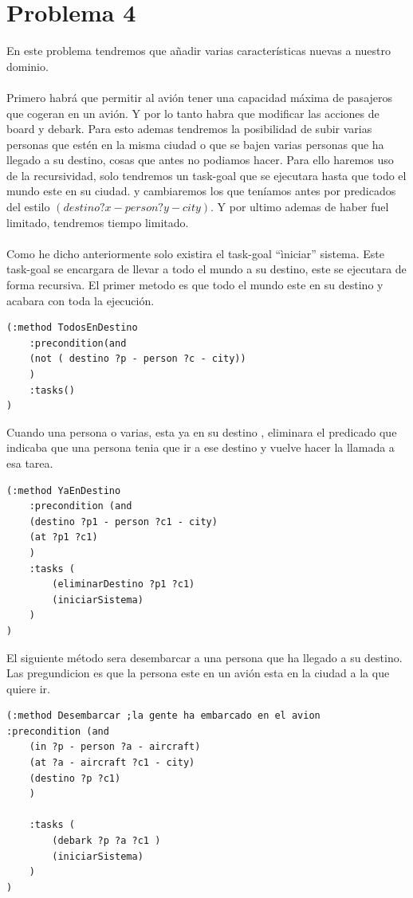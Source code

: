\documentclass[12pt,a4paper]{article}
\begin{document}
\section{Problema 4}
En este problema tendremos que añadir varias características nuevas a nuestro dominio.\\\\
Primero habrá que permitir al avión tener una capacidad máxima de pasajeros que cogeran en un avión. Y por lo tanto habra que modificar las acciones de board y debark. Para esto ademas tendremos la posibilidad de subir varias personas que estén en la misma ciudad o que se bajen varias personas que ha llegado a su destino, cosas que antes no podiamos hacer. Para ello haremos uso de la recursividad, solo tendremos un task-goal que se ejecutara hasta que todo el mundo este en su ciudad. y cambiaremos los que teníamos antes por predicados del estilo $(destino ?x - person ?y - city)$. Y por ultimo ademas de haber fuel limitado, tendremos tiempo limitado. \\\\
Como he dicho anteriormente solo existira el task-goal ``ìniciar'' sistema. Este task-goal se encargara de llevar a todo el mundo a su destino, este se ejecutara de forma recursiva. El primer metodo es que todo el mundo este en su destino y acabara con toda la ejecución.
\begin{lstlisting}
(:method TodosEnDestino
	:precondition(and
	(not ( destino ?p - person ?c - city))
	)
	:tasks()
) 
\end{lstlisting}
Cuando una persona o varias, esta ya en su destino , eliminara el predicado que indicaba que una persona tenia que ir a ese destino y vuelve hacer la llamada a esa tarea.
\begin{lstlisting}
(:method YaEnDestino
	:precondition (and 
	(destino ?p1 - person ?c1 - city)
	(at ?p1 ?c1)
	) 
	:tasks (
		(eliminarDestino ?p1 ?c1)
		(iniciarSistema)
	)
)
\end{lstlisting}
El siguiente método sera desembarcar a una persona que ha llegado a su destino. Las pregundicion es que la persona este en un avión esta en la ciudad a la que quiere ir. 
\begin{lstlisting}
(:method Desembarcar ;la gente ha embarcado en el avion
:precondition (and 
	(in ?p - person ?a - aircraft)
	(at ?a - aircraft ?c1 - city)
	(destino ?p ?c1)
	)
	
	:tasks ( 
		(debark ?p ?a ?c1 )
		(iniciarSistema)
	)
)
\end{lstlisting}
\end{document}
